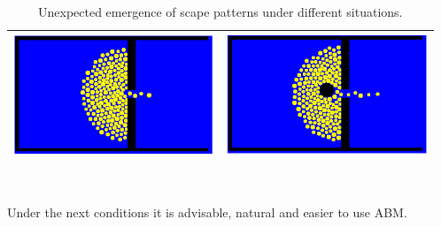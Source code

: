 \documentclass[11pt,oneside,a4paper,openright]{report}
\begin{document}
	\begin{table}[ht!]
	\centering
	\begin{tabular}{|c|c|}
		\hline
		\includegraphics[width=60mm,keepaspectratio=true]{figures/column1.png}
		&
		\includegraphics[width=60mm,keepaspectratio=true]{figures/column2.png}\\
		\hline
	\end{tabular}
	\caption{Unexpected emergence of scape patterns under different situations.}
	\label{tab:columnExit}
	\end{table}

\\

Under the next conditions it is advisable, natural and easier to use ABM.
\end{document}

